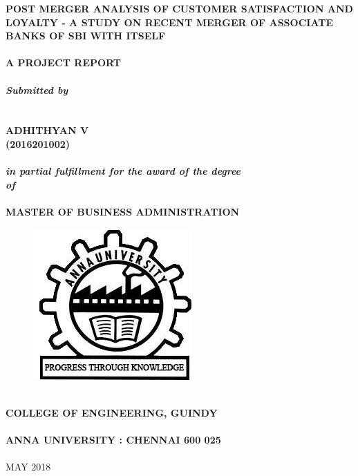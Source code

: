 \documentclass[a4paper, 14pt]{article}
\newcommand\tab[1][1cm]{\hspace*{#1}}
\begin{document}
{
\selectfont
\begin{center}	
\textbf{\fontsize{18}{2} \selectfont POST MERGER ANALYSIS OF CUSTOMER SATISFACTION AND LOYALTY - A STUDY ON RECENT MERGER OF ASSOCIATE BANKS OF SBI WITH ITSELF}\\
\tab \\
\textbf{\fontsize{14}{2} \selectfont A PROJECT REPORT}\\
\tab \\
\textbf{\fontsize{14}{2} \selectfont \emph{Submitted by}}\\
\tab \\
\tab \\
{\fontsize{16}{2} \selectfont
\textbf{ADHITHYAN V}}\\
{\fontsize{16}{2} \selectfont \textbf{(2016201002)}}\\
\tab \\
\textbf{\emph{\fontsize{14}{2} \selectfont in partial fulfillment for the award of the degree\\ of}}\\
\tab \\
\textbf{\fontsize{16}{2} \selectfont MASTER OF BUSINESS ADMINISTRATION}\\
\begin{figure}[H]
\centering
\includegraphics[scale=0.5]{anna_univ_logo.jpg}
\end{figure}
\tab \\
\textbf{\fontsize{14}{2} \selectfont COLLEGE OF ENGINEERING, GUINDY}\\
\tab \\
\textbf{\fontsize{16}{2} \selectfont ANNA UNIVERSITY : CHENNAI 600 025}\\
\tab \\
{\fontsize{14}{2} \selectfont MAY 2018}\\
\end{center}
	
}
\end{document}
